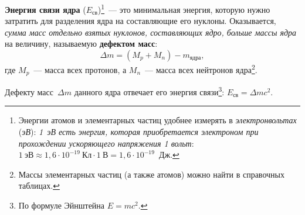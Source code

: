 \documentclass[main.tex]{subfiles}
\begin{document}
\textbf{Энергия связи ядра} ($E_\text{св}$)\footnote{Энергии атомов и элементарных частиц удобнее измерять в \emph{электронвольтах} (\emph{эВ}): \emph{1~эВ есть энергия, которая приобретается электроном при прохождении ускоряющего напряжения 1 вольт}: $1~\text{эВ}\approx1{,}6\cdot10^{-19}~\text{Кл}\cdot1~\text{В}= 1{,}6\cdot10^{-19}$~Дж.}~--- это минимальная энергия, которую нужно затратить для разделения ядра на составляющие его нуклоны. Оказывается, \emph{сумма масс отдельно взятых нуклонов, составляющих ядро, больше массы ядра} на величину, называемую \textbf{дефектом масс}:
\begin{equation}
    \Delta m=\left(M_p+M_n\right)-m_\text{ядра},
\end{equation}
где $M_p$~--- масса всех протонов, а $M_n$~--- масса всех нейтронов ядра\footnote{Массы элементарных частиц (а также атомов) можно найти в справочных таблицах.}.

Дефекту масс~$\Delta m$ данного ядра отвечает его энергия связи\footnote{По формуле Эйнштейна $E=mc^2$.}: $E_\text{св}=\Delta mc^2$.




 
\end{document}
